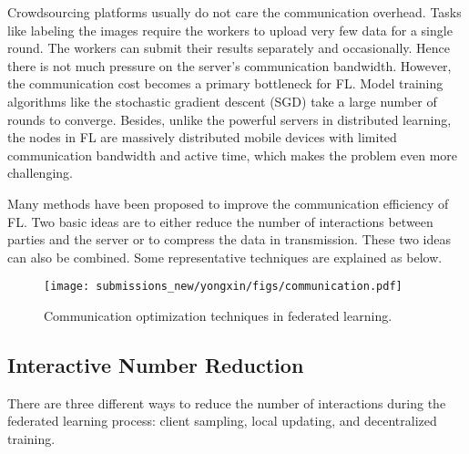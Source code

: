 \documentclass[11pt]{article}
\begin{document}
Crowdsourcing platforms usually do not care the communication overhead. 
Tasks like labeling the images require the workers to upload very few data for a single round. 
The workers can submit their results separately and occasionally.
Hence there is not much pressure on the server's communication bandwidth. 
However, the communication cost becomes a primary bottleneck for FL.
Model training algorithms like the stochastic gradient descent (SGD) take a large number of rounds to converge.
Besides, unlike the powerful servers in distributed learning, the nodes in FL are massively distributed mobile devices with limited communication bandwidth and active time, which makes the problem even more challenging.   

Many methods have been proposed to improve the communication efficiency of FL. 
Two basic ideas are to either reduce the number of interactions between parties and the server or to compress the data in transmission. 
These two ideas can also be combined.
Some representative techniques are explained as below.

\begin{figure}
\centering
\texttt{[image: submissions\_new/yongxin/figs/communication.pdf]}
\caption{Communication optimization techniques in federated learning.}
\label{fig:communication}
\end{figure}

\subsection{Interactive Number Reduction}

There are three different ways to reduce the number of interactions during the federated learning process: client sampling, 
local updating, 
and decentralized training.
\end{document}
